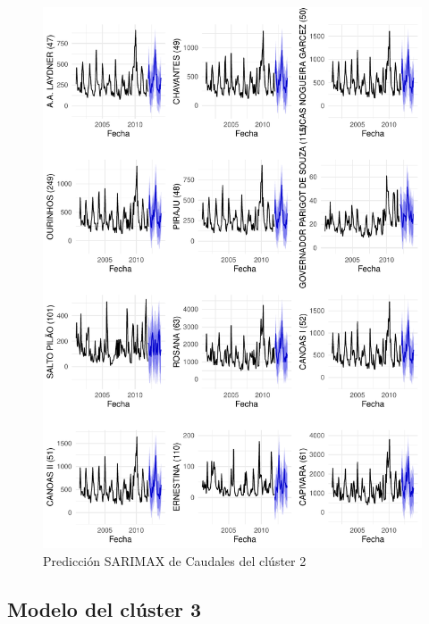 \documentclass[12pt,oneside]{book}\usepackage[]{graphicx}\usepackage[]{color}
\makeatletter
\def\maxwidth{ %
  \ifdim\Gin@nat@width>\linewidth
    \linewidth
  \else
    \Gin@nat@width
  \fi
}
\newenvironment{knitrout}{}{} %
\theoremstyle{definition} %
\makeatother
\begin{document}
\begin{knitrout}
\color{fgcolor}\begin{figure}[h]

{\centering \includegraphics[width=\maxwidth,height=0.85\textheight]{figure/unnamed-chunk-105-1} 

}

\caption{\label{fig:pred_clx2} Predicción SARIMAX de Caudales del clúster 2}\label{fig:unnamed-chunk-105}
\end{figure}


\end{knitrout}






\subsection{Modelo del clúster 3}
\end{document}
